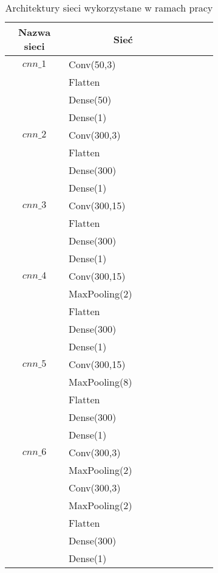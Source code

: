 \begin{longtable}{| c | m{0.58\linewidth} | r | m{0.1\linewidth} |}
    \caption{Architektury sieci wykorzystane w ramach pracy}
    \label{table:architektury_sieci}        \\
    \hline
    Nazwa sieci & \multicolumn{1}{c|}{Sieć} \\ \hline\hline \endfirsthead

    \endfoot
    \hline \endlastfoot

    $cnn\_1$    & Conv(50,3)                \\
                & Flatten                   \\
                & Dense(50)                 \\
                & Dense(1)                  \\ \hline
    $cnn\_2$    & Conv(300,3)               \\
                & Flatten                   \\
                & Dense(300)                \\
                & Dense(1)                  \\ \hline
    $cnn\_3$    & Conv(300,15)              \\
                & Flatten                   \\
                & Dense(300)                \\
                & Dense(1)                  \\ \hline
    $cnn\_4$    & Conv(300,15)              \\
                & MaxPooling(2)             \\
                & Flatten                   \\
                & Dense(300)                \\
                & Dense(1)                  \\ \hline
    $cnn\_5$    & Conv(300,15)              \\
                & MaxPooling(8)             \\
                & Flatten                   \\
                & Dense(300)                \\
                & Dense(1)                  \\ \hline
    $cnn\_6$    & Conv(300,3)               \\
                & MaxPooling(2)             \\
                & Conv(300,3)               \\
                & MaxPooling(2)             \\
                & Flatten                   \\
                & Dense(300)                \\
                & Dense(1)                  \\ \hline


\end{longtable}
